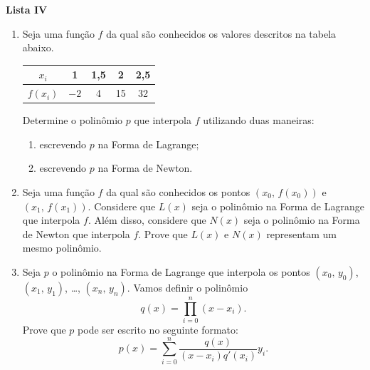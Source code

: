 \documentclass[12pt,a4paper]{article}
\begin{document}
\begin{center}
  \textbf{Lista IV}
\end{center}

\begin{enumerate}
  \item Seja uma função $f$ da qual são conhecidos os valores descritos na
  tabela abaixo.
  \begin{center}
    \begin{tabular}{c|c|c|c|c}
      $x_i$ & 1 & 1,5 & 2 & 2,5\\ \hline
      $f(x_i)$ & $-2$ & 4 & 15 & 32
    \end{tabular}
  \end{center}

  Determine o polinômio $p$ que interpola $f$ utilizando duas maneiras:
  \begin{enumerate}
   \item escrevendo $p$ na Forma de Lagrange;
   \item escrevendo $p$ na Forma de Newton.
  \end{enumerate}

  \item Seja uma função $f$ da qual são conhecidos os pontos $(x_0,\,f(x_0))$ e 
  $(x_1,\,f(x_1))$. Considere que $L(x)$ seja o polinômio na Forma de Lagrange que
  interpola $f$. Além disso, considere que $N(x)$ seja o polinômio na Forma de Newton que
  interpola $f$. Prove que $L(x)$ e $N(x)$ representam um mesmo polinômio.

  \item Seja $p$ o polinômio na Forma de Lagrange que interpola os pontos
  $(x_0,\,y_0)$, $(x_1,\,y_1)$, \ldots, $(x_n,\,y_n)$. Vamos definir o polinômio
  $$q(x) = \prod_{i=0}^{n} (x-x_i).$$ Prove que $p$ pode ser escrito no seguinte
  formato: 
  $$p(x) = \sum_{i=0}^n\frac{q(x)}{(x-x_i)q'(x_i)}y_i.$$

\end{enumerate}
\end{document}
